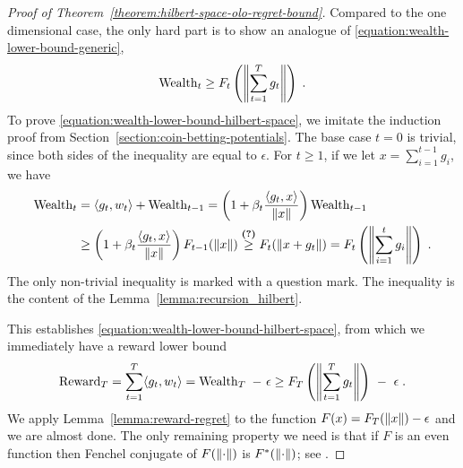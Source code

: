 \begin{proof}[Proof of Theorem~\ref{theorem:hilbert-space-olo-regret-bound}]
Compared to the one dimensional case, the only hard part is to show an analogue of \eqref{equation:wealth-lower-bound-generic},
\begin{equation}
\label{equation:wealth-lower-bound-hilbert-space}
\operatorname{Wealth}_t \ge F_t\left(\left\|{\sum_{t=1}^T g_t}\right\| \right) \; .
\end{equation}
To prove \eqref{equation:wealth-lower-bound-hilbert-space}, we imitate the induction
proof from Section~\ref{section:coin-betting-potentials}. The base case
$t=0$ is trivial, since both sides of the inequality are equal to $\epsilon$.
For $t \ge 1$, if we let $x = \sum_{i=1}^{t-1} g_i$, we have
\begin{align*}
\operatorname{Wealth}_t
&= \langle g_t, w_t \rangle + \operatorname{Wealth}_{t-1}
= \left(1 + \beta_t \frac{\langle g_t, x \rangle}{\left\|{x}\right\|} \right) \operatorname{Wealth}_{t-1} \\
&\ge \left(1 + \beta_t \frac{\langle g_t, x \rangle}{\left\|{x}\right\|} \right) F_{t-1}(\left\|{x}\right\|)
\stackrel{\text{\textbf{(?)}}}{\ge} F_t(\left\|{x + g_t}\right\|)
= F_t\left(\left\|{\sum_{i=1}^t g_i}\right\| \right) \; .
\end{align*}
The only non-trivial inequality is marked with a question mark. The inequality
is the content of the Lemma~\ref{lemma:recursion_hilbert}. 

This establishes \eqref{equation:wealth-lower-bound-hilbert-space},
from which we immediately have a reward lower bound
\begin{equation}
\label{equation:hilbert-space-olo-reward-lower-bound}
\operatorname{Reward}_T
= \sum_{t=1}^T \langle g_t, w_t \rangle
= \operatorname{Wealth}_T \ - \ \epsilon
\ge F_T\left(\left\|{\sum_{t=1}^T g_t}\right\| \right) \ - \ \epsilon \; .
\end{equation}
We apply Lemma~\ref{lemma:reward-regret} to the function $F(x) = F_T(\left\|{x}\right\|) -
\epsilon$ and we are almost done. The only remaining property we need is that if
$F$ is an even function then Fenchel conjugate of $F(\left\|{\cdot}\right\|)$ is
$F^*(\left\|{\cdot}\right\|)$; see \citet[Example 13.7]{BauschkeC2011}.
\end{proof}
